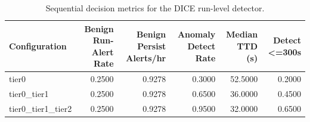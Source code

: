 \begin{table}[t]
\centering
\caption{Sequential decision metrics for the DICE run-level detector.}
\label{tab:dice_sequential_metrics}
\footnotesize
\begin{tabular}{lrrrrr}
\toprule
Configuration & Benign Run-Alert Rate & Benign Persist Alerts/hr & Anomaly Detect Rate & Median TTD (s) & Detect <=300s \\
\midrule
tier0 & 0.2500 & 0.9278 & 0.3000 & 52.5000 & 0.2000 \\
tier0_tier1 & 0.2500 & 0.9278 & 0.6500 & 36.0000 & 0.4500 \\
tier0_tier1_tier2 & 0.2500 & 0.9278 & 0.9500 & 32.0000 & 0.6500 \\
\bottomrule
\end{tabular}

\end{table}
